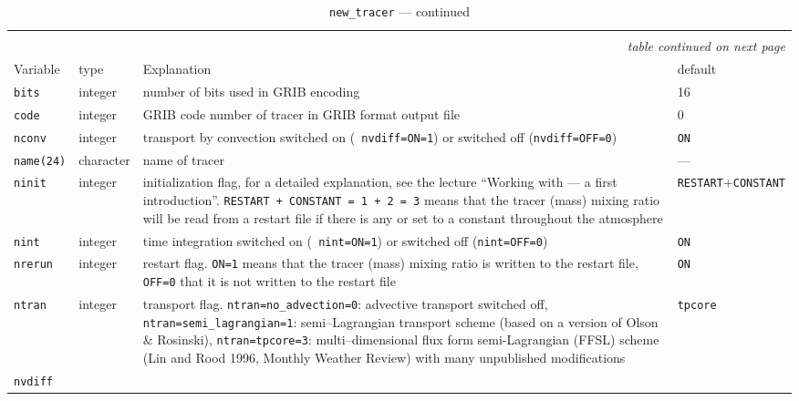 \begin{longtable}{l@{\extracolsep\fill}lp{7cm}p{3.5cm}}\hline\hline
\caption[Namelist {\tt new\_tracer}]{Namelist 
  {\tt new\_tracer}}\\\hline\label{tabnewtracer}
\endfirsthead
\caption[]{{\tt new\_tracer} --- continued}\\\hline
\endhead
\hline\multicolumn{4}{r}{\slshape table continued on next page}\\
\endfoot
\hline %
\endlastfoot
Variable & type & Explanation & default \\\hline
{\tt bits}\index{namelist variables!bits}
 & integer & number of bits used in GRIB encoding & 16 \\
{\tt code}\index{namelist variables!code}
 & integer & GRIB code number of tracer in GRIB format
output file & 0 \\
{\tt nconv}\index{namelist variables!nconv}
 & integer & transport by convection switched on ({\tt
  nvdiff=ON=1}) or switched off ({\tt nvdiff=OFF=0}) & {\tt ON}\\
{\tt name(24)}\index{namelist variables!name} 
 & character & name of tracer & --- \\
{\tt ninit}\index{namelist variables!ninit}
 & integer & initialization flag, for a detailed
explanation, see the lecture ``Working with \echam{} --- a first
introduction''. {\tt RESTART + CONSTANT = 1 + 2 = 3} means that the
tracer (mass) 
mixing ratio will be read from a restart file if there is any or set
to a constant throughout the atmosphere & {\tt RESTART}+{\tt CONSTANT} \\
{\tt nint}\index{namelist variables!nint}
 & integer & time integration switched on ({\tt
  nint=ON=1}) or switched off ({\tt nint=OFF=0}) & {\tt ON}\\
{\tt nrerun}\index{namelist variables!nrerun}
 & integer & restart flag. {\tt ON=1} means that the tracer
(mass) mixing ratio is written to the restart file, {\tt OFF=0} that it
is not written to the restart file & {\tt ON} \\
{\tt ntran}\index{namelist variables!ntran}
 & integer & transport flag. {\tt ntran=no\_advection=0}:
advective transport switched off, {\tt ntran=semi\_lagrangian=1}:
semi--Lagrangian transport scheme (based on a version of Olson \&
Rosinski), {\tt ntran=tpcore=3}: multi--dimensional 
flux form semi-Lagrangian (FFSL) scheme (Lin and Rood 1996, Monthly
Weather Review) with many unpublished modifications  & {\tt tpcore} \\
{\tt nvdiff}\index{namelist variables!nvdiff}

\end{longtable}
